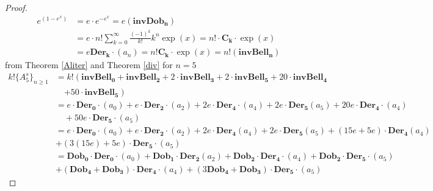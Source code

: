 \documentclass[pdflatex,sn-mathphys-num]{sn-jnl}%
\theoremstyle{thmstyleone}%
\theoremstyle{thmstyletwo}%
\theoremstyle{thmstylethree}%
\begin{document}
\begin{proof}

    
\begin{align*}
e^{(1-e^x)} & = e\cdotp e^{-e^x} = e( \mathbf{invDob_n})\\
&= e\cdotp n!\sum^{\infty}_{k=0}\frac{(-1)^k}{k!}k^n
 \exp(x)=n!\cdotp \mathbf{C_k} \cdotp \exp{(x)}\\
 & = e\mathbf{Der_k}\cdotp(a_n) = n!\mathbf{C_k} \cdotp \exp{(x)}= n!(\mathbf{inv Bell_n})
 \end{align*}
from Theorem \ref{Aliter} and Theorem \ref{div} for $n=5$
\begin{align*}
   k! \lbrace A_5^s\rbrace_{n\geq 1}&= k! \left(\mathbf{invBell_0} + \mathbf{invBell_2} + 2\cdotp \mathbf{invBell_3} +2\cdotp \mathbf{invBell_5} + 20\cdotp \mathbf{invBell_4}\right.\\ &\quad\left.+ 50\cdotp \mathbf{invBell_{5}}\right)\\
   &=e\cdotp \mathbf{Der_0}\cdotp(a_0) + e\cdotp\mathbf{Der_2}\cdotp(a_2) + 2e\cdotp \mathbf{Der_4}\cdotp(a_4) +2e\cdotp \mathbf{Der_5}(a_5) + 20e\cdotp \mathbf{Der_4}\cdotp(a_4) \\
   & \quad + 50e\cdotp \mathbf{Der_{5}}\cdotp(a_5)\\
    &=e\cdotp \mathbf{Der_0}\cdotp(a_0) + e\cdotp\mathbf{Der_2}\cdotp(a_2) + 2e\cdotp \mathbf{Der_4}(a_4) +2e\cdotp \mathbf{Der_5}(a_5) + (15e+ 5e)\cdotp \mathbf{Der_4}(a_4) \\\nonumber
    &+ (3(15e)+5e)\cdotp \mathbf{Der_{5}}\cdotp(a_5)\\\nonumber
  &=\mathbf{Dob_0}\cdotp \mathbf{Der_0}\cdotp(a_0) + \mathbf{Dob_1}\cdotp\mathbf{Der_2}(a_2) + \mathbf{Dob_2}\cdotp \mathbf{Der_4}\cdotp(a_4) + \mathbf{Dob_2}\cdotp \mathbf{Der_5}\cdotp(a_5) \\\nonumber
 & + (\mathbf{Dob_4}+ \mathbf{Dob_3})\cdotp \mathbf{Der_4}\cdotp(a_4)+ (3\mathbf{Dob_4}+ \mathbf{Dob_3})\cdotp \mathbf{Der_{5}}\cdotp(a_5)
\end{align*}
\end{proof}
\end{document}

